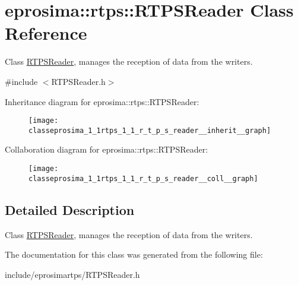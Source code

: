 \hypertarget{classeprosima_1_1rtps_1_1_r_t_p_s_reader}{\section{eprosima\-:\-:rtps\-:\-:\-R\-T\-P\-S\-Reader \-Class \-Reference}
\label{classeprosima_1_1rtps_1_1_r_t_p_s_reader}
}


\-Class \hyperlink{classeprosima_1_1rtps_1_1_r_t_p_s_reader}{\-R\-T\-P\-S\-Reader}, manages the reception of data from the writers.  




{\ttfamily \#include $<$\-R\-T\-P\-S\-Reader.\-h$>$}



\-Inheritance diagram for eprosima\-:\-:rtps\-:\-:\-R\-T\-P\-S\-Reader\-:\nopagebreak
\begin{figure}[H]
\begin{center}
\leavevmode
\texttt{[image: classeprosima\_1\_1rtps\_1\_1\_r\_t\_p\_s\_reader\_\_inherit\_\_graph]}
\end{center}
\end{figure}


\-Collaboration diagram for eprosima\-:\-:rtps\-:\-:\-R\-T\-P\-S\-Reader\-:\nopagebreak
\begin{figure}[H]
\begin{center}
\leavevmode
\texttt{[image: classeprosima\_1\_1rtps\_1\_1\_r\_t\_p\_s\_reader\_\_coll\_\_graph]}
\end{center}
\end{figure}


\subsection{\-Detailed \-Description}
\-Class \hyperlink{classeprosima_1_1rtps_1_1_r_t_p_s_reader}{\-R\-T\-P\-S\-Reader}, manages the reception of data from the writers. 

\-The documentation for this class was generated from the following file\-:\begin{DoxyCompactItemize}
\item 
include/eprosimartps/\-R\-T\-P\-S\-Reader.\-h\end{DoxyCompactItemize}
